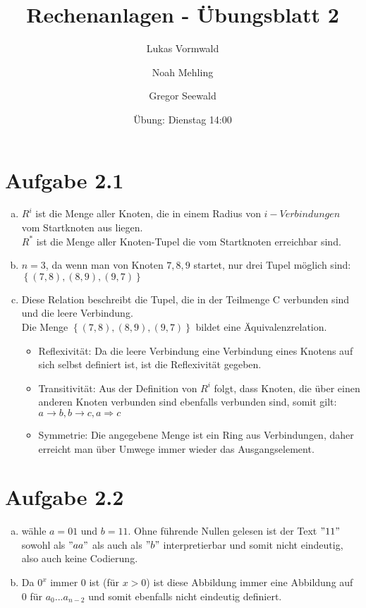 \documentclass[11pt,a4paper]{article}
\title{Rechenanlagen - Übungsblatt 2}
\author{Lukas Vormwald \and Noah Mehling \and Gregor Seewald}
\date{Übung: Dienstag 14:00}
\begin{document}
	\maketitle
	\section*{Aufgabe 2.1}
		\begin{enumerate}[a)]
			\item $R^i$ ist die Menge aller Knoten, die in einem Radius von $i-Verbindungen$ vom Startknoten aus liegen.\\
			$R^*$ ist die Menge aller Knoten-Tupel die vom Startknoten erreichbar sind.
			\item $n=3$, da wenn man von Knoten $7,8,9$ startet, nur drei Tupel möglich sind:$\left\lbrace(7,8),(8,9),(9,7) \right\rbrace$
			\item Diese Relation beschreibt die Tupel, die in der Teilmenge C verbunden sind und die leere Verbindung.\\
			Die Menge $\left\lbrace(7,8),(8,9),(9,7) \right\rbrace$ bildet eine Äquivalenzrelation.\\
			\begin{itemize}
				\item Reflexivität: Da die leere Verbindung eine Verbindung eines Knotens auf sich selbst definiert ist, ist die Reflexivität gegeben.
				\item Transitivität: Aus der Definition von $R^i$ folgt, dass Knoten, die über einen anderen Knoten verbunden sind ebenfalls verbunden sind, somit gilt:$a\rightarrow b, b\rightarrow c, a \Rightarrow c$
				\item Symmetrie: Die angegebene Menge ist ein Ring aus Verbindungen, daher erreicht man über Umwege immer wieder das Ausgangselement.
			\end{itemize}
		\end{enumerate}
	\section*{Aufgabe 2.2}
		\begin{enumerate}[a)]
			\item wähle $a=01$ und $b=11$. Ohne führende Nullen gelesen ist der Text $"11"$ sowohl als $"aa"$ als auch als $"b"$ interpretierbar und somit nicht eindeutig, also auch keine Codierung.
			\item Da $0^x$ immer $0$ ist (für $x>0$) ist diese Abbildung immer eine Abbildung auf $0$ für $a_0 ... a_{n-2}$ und somit ebenfalls nicht eindeutig definiert.
		\end{enumerate}\newpage
\end{document}

